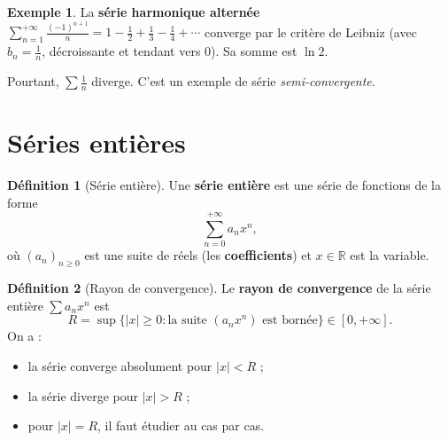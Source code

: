 \documentclass[12pt,a4paper,openany]{book}
\theoremstyle{definition}
\newtheorem{definition}{Définition}[chapter]
\newtheorem{exemple}{Exemple}[chapter]
\newcommand{\R}{\mathbb{R}}
\newcommand{\abs}[1]{\left\lvert #1 \right\rvert}
\begin{document}
\begin{exemple}\label{ex:serie-alternee-harmonique}
  La \textbf{série harmonique alternée} $\displaystyle\sum_{n=1}^{+\infty} \frac{(-1)^{n+1}}{n}
  = 1 - \frac{1}{2} + \frac{1}{3} - \frac{1}{4} + \cdots$
  converge par le critère de Leibniz (avec $b_n = \frac{1}{n}$, décroissante et tendant vers $0$).
  Sa somme est $\ln 2$.

  Pourtant, $\sum \frac{1}{n}$ diverge. C'est un exemple de série \emph{semi-convergente}.
\end{exemple}

\section{Séries entières}\label{sec:series:entieres}

\begin{definition}[Série entière]\label{def:serie-entiere}
  Une \textbf{série entière} est une série de fonctions de la forme
  \[
    \sum_{n=0}^{+\infty} a_n x^n,
  \]
  où $(a_n)_{n \geq 0}$ est une suite de réels (les \textbf{coefficients}) et $x \in \R$
  est la variable.
\end{definition}

\begin{definition}[Rayon de convergence]\label{def:rayon-convergence}
  Le \textbf{rayon de convergence} de la série entière $\sum a_n x^n$ est
  \[
    R = \sup\bigl\{\abs{x} \geq 0 : \text{la suite } (a_n x^n) \text{ est bornée}\bigr\}
      \in [0, +\infty].
  \]
  On a :
  \begin{itemize}
    \item la série converge absolument pour $\abs{x} < R$ ;
    \item la série diverge pour $\abs{x} > R$ ;
    \item pour $\abs{x} = R$, il faut étudier au cas par cas.
  \end{itemize}
\end{definition}
\end{document}
